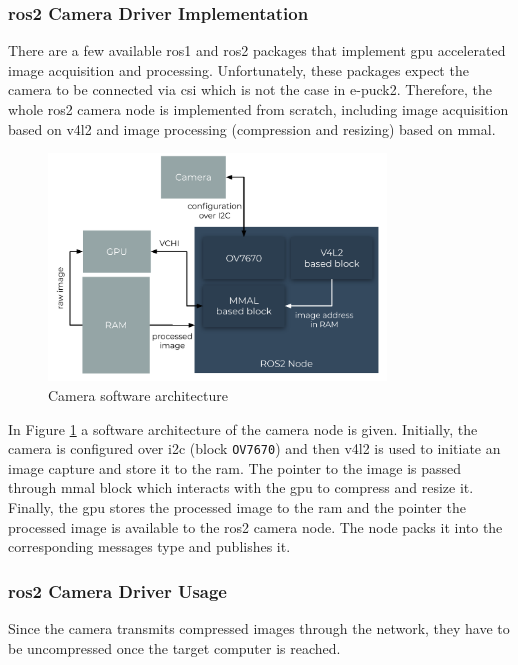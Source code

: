 \subsubsection{\ac{ros2} Camera Driver Implementation}
There are a few available \ac{ros1} and \ac{ros2} packages that implement \ac{gpu} accelerated image acquisition and processing.
Unfortunately, these packages expect the camera to be connected via \ac{csi} which is not the case in e-puck2. 
Therefore, the whole \ac{ros2} camera node is implemented from scratch, including image acquisition based on \ac{v4l2} and image processing (compression and resizing) based on \ac{mmal}.
 
 \begin{figure}[H]
    \centering
    \includegraphics[width=0.8\textwidth]{physical/figures/camera_software_architecture.pdf}
    \caption{Camera software architecture}
    \label{fig:physical:camera_software_architecture}
\end{figure}
 
 In Figure \ref{fig:physical:camera_software_architecture} a software architecture of the camera node is given. 
 Initially, the camera is configured over \ac{i2c} (block \texttt{OV7670}) and then \ac{v4l2} is used to initiate an image capture and store it to the \ac{ram}.
 The pointer to the image is passed through \ac{mmal} block which interacts with the \ac{gpu} to compress and resize it. 
 Finally, the \ac{gpu} stores the processed image to the \ac{ram} and the pointer the processed image is available to the \ac{ros2} camera node.
 The node packs it into the corresponding messages type and publishes it.
 
 \subsubsection{\ac{ros2} Camera Driver Usage}
 Since the camera transmits compressed images through the network, they have to be uncompressed once the target computer is reached.
 
